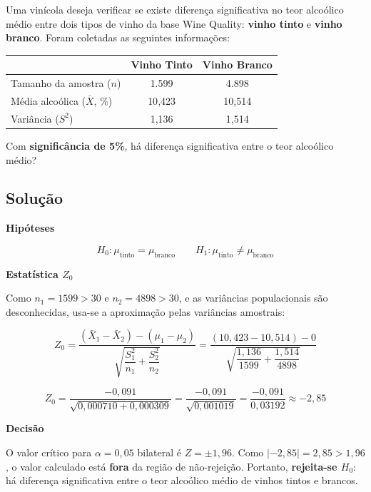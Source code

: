 \documentclass[12pt,a4paper]{article}
\begin{document}
Uma vinícola deseja verificar se existe diferença significativa no teor alcoólico
médio entre dois tipos de vinho da base Wine Quality: \textbf{vinho tinto} e
\textbf{vinho branco}. Foram coletadas as seguintes informações:

\begin{center}
\begin{tabular}{lcc}
  \toprule
  & \textbf{Vinho Tinto} & \textbf{Vinho Branco} \\
  \midrule
  Tamanho da amostra ($n$) & 1.599      & 4.898     \\
  Média alcoólica ($\bar{X}$, \%) & 10{,}423   & 10{,}514  \\
  Variância ($S^2$)        & 1{,}136    & 1{,}514  \\
  \bottomrule
\end{tabular}
\end{center}

Com \textbf{significância de 5\%}, há diferença significativa entre o teor alcoólico médio?

\subsection*{Solução}

\textbf{Hipóteses}

\[
  H_0: \mu_{\text{tinto}} = \mu_{\text{branco}} \qquad H_1: \mu_{\text{tinto}} \neq \mu_{\text{branco}}
\]

\textbf{Estatística $Z_0$}

Como $n_1 = 1599 > 30$ e $n_2 = 4898 > 30$, e as variâncias populacionais são
desconhecidas, usa-se a aproximação pelas variâncias amostrais:

\[
  Z_0 = \frac{(\bar{X}_1 - \bar{X}_2) - (\mu_1 - \mu_2)}
             {\sqrt{\dfrac{S_1^2}{n_1} + \dfrac{S_2^2}{n_2}}}
      = \frac{(10{,}423 - 10{,}514) - 0}
             {\sqrt{\dfrac{1{,}136}{1599} + \dfrac{1{,}514}{4898}}}
\]

\[
  Z_0 = \frac{-0{,}091}{\sqrt{0{,}000710 + 0{,}000309}}
      = \frac{-0{,}091}{\sqrt{0{,}001019}}
      = \frac{-0{,}091}{0{,}03192}
      \approx -2{,}85
\]

\textbf{Decisão}

O valor crítico para $\alpha = 0{,}05$ bilateral é $Z = \pm 1{,}96$.
Como $|{-2{,}85}| = 2{,}85 > 1{,}96$, o valor calculado está \textbf{fora}
da região de não-rejeição. Portanto, \textbf{rejeita-se $H_0$}: há diferença
significativa entre o teor alcoólico médio de vinhos tintos e brancos.
\end{document}
